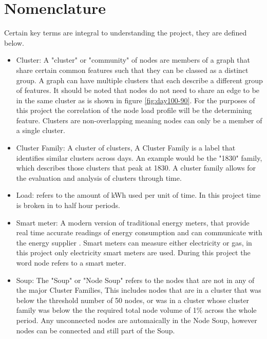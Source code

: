 \section{Nomenclature}
Certain key terms are integral to understanding the project, they are defined below.
\begin{itemize}
\itemsep0em 
    \item Cluster: A "cluster" or "community" of nodes are members of a graph that share certain common features such that they can be classed as a distinct group. A graph can have multiple clusters that each describe a different group of features. It should be noted that nodes do not need to share an edge to be in the same cluster as is shown in figure \ref{fig:day100-90}. For the purposes of this project the correlation of the node load profile will be the determining feature. Clusters are non-overlapping meaning nodes can only be a member of a single cluster.
    \item Cluster Family: A cluster of clusters, A Cluster Family is a label that identifies similar clusters across days. An example would be the "1830" family, which describes those clusters that peak at 1830. A cluster family allows for the evaluation and analysis of clusters through time.
    \item Load: refers to the amount of kWh used per unit of time. In this project time is broken in to half hour periods.
    \item Smart meter: A modern version of traditional energy meters, that provide real time accurate readings of energy consumption and can communicate with the energy supplier \cite{whatisasmartmeterhowdoesasmartmeterwork}\cite{departmentforbusinessenergyindustrialstrategy2013}. Smart meters can measure either electricity or gas, in this project only electricity smart meters are used. During this project the word node refers to a smart meter.
    \item Soup: The "Soup" or "Node Soup" refers to the nodes that are not in any of the major Cluster Families, This includes nodes that are in a cluster that was below the threshold number of 50 nodes, or was in a cluster whose cluster family was below the the required total node volume of 1\% across the whole period. Any unconnected nodes are automaically in the Node Soup, however nodes can be connected and still part of the Soup.
    \end{itemize}